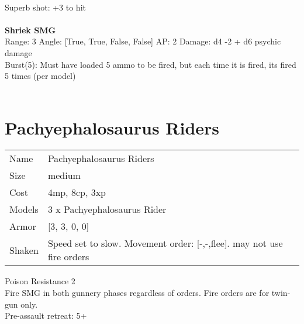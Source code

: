 \ \\
Superb shot: +3 to hit\\ 

\ \\
{\bf Shriek SMG } \\



Range: 3  Angle: [True, True, False, False] AP: 2 Damage: d4 -2 + d6 psychic damage \\
Burst(5): Must have loaded 5 ammo to be fired, but each time it is fired, its fired 5 times (per model)\\ 




 
\ \\













\clearpage

\section{ Pachyephalosaurus Riders }

\begin{tabular}{ll}
  Name & Pachyephalosaurus Riders \\
  Size & medium\\
  Cost & 4mp, 8cp, 3xp\\
  Models & 3 x Pachyephalosaurus Rider\\
  Armor & [3, 3, 0, 0]\\
  Shaken & Speed set to slow. Movement order: [-,-,flee]. may not use fire orders\\
\end{tabular}

\noindent Poison Resistance 2\\ 
Fire SMG in both gunnery phases regardless of orders. Fire orders are for twin-gun only.\\ 
Pre-assault retreat: 5+\\ 


